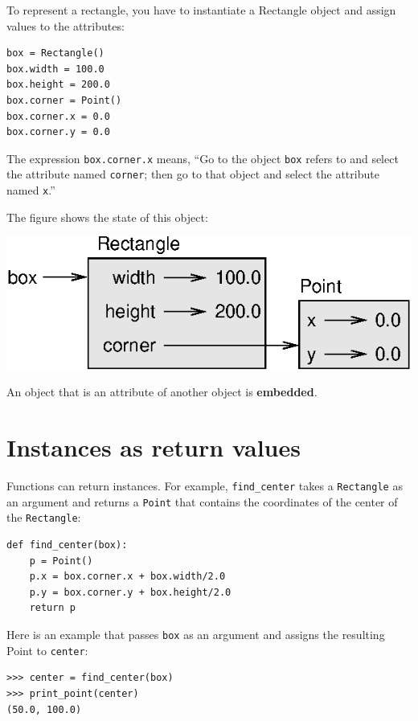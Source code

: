 \documentclass[10pt]{book}
\begin{document}
To represent a rectangle, you have to instantiate a Rectangle
object and assign values to the attributes:

\beforeverb
\begin{verbatim}
box = Rectangle()
box.width = 100.0
box.height = 200.0
box.corner = Point()
box.corner.x = 0.0
box.corner.y = 0.0
\end{verbatim}
\afterverb
%
The expression {\tt box.corner.x} means,
``Go to the object {\tt box} refers to and select the attribute named
{\tt corner}; then go to that object and select the attribute named
{\tt x}.''

The figure shows the state of this object:


\beforefig
\centerline{\includegraphics{figs/rectangle.eps}}
\afterfig

An object that is an attribute of another object is {\bf embedded}.



\section{Instances as return values}


Functions can return instances.  For example, \verb"find_center"
takes a {\tt Rectangle} as an argument and returns a {\tt Point}
that contains the coordinates of the center of the {\tt Rectangle}:

\beforeverb
\begin{verbatim}
def find_center(box):
    p = Point()
    p.x = box.corner.x + box.width/2.0
    p.y = box.corner.y + box.height/2.0
    return p
\end{verbatim}
\afterverb
%
Here is an example that passes {\tt box} as an argument and assigns
the resulting Point to {\tt center}:

\beforeverb
\begin{verbatim}
>>> center = find_center(box)
>>> print_point(center)
(50.0, 100.0)
\end{verbatim}
\afterverb
%
\end{document}
